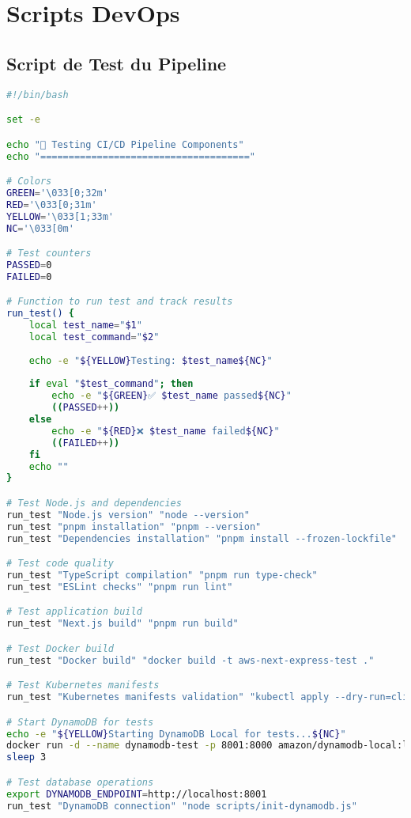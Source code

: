 \section{Scripts DevOps}

\subsection{Script de Test du Pipeline}

\begin{lstlisting}[language=bash, caption=scripts/test-pipeline.sh]
#!/bin/bash

set -e

echo "🧪 Testing CI/CD Pipeline Components"
echo "====================================="

# Colors
GREEN='\033[0;32m'
RED='\033[0;31m'
YELLOW='\033[1;33m'
NC='\033[0m'

# Test counters
PASSED=0
FAILED=0

# Function to run test and track results
run_test() {
    local test_name="$1"
    local test_command="$2"
    
    echo -e "${YELLOW}Testing: $test_name${NC}"
    
    if eval "$test_command"; then
        echo -e "${GREEN}✅ $test_name passed${NC}"
        ((PASSED++))
    else
        echo -e "${RED}❌ $test_name failed${NC}"
        ((FAILED++))
    fi
    echo ""
}

# Test Node.js and dependencies
run_test "Node.js version" "node --version"
run_test "pnpm installation" "pnpm --version"
run_test "Dependencies installation" "pnpm install --frozen-lockfile"

# Test code quality
run_test "TypeScript compilation" "pnpm run type-check"
run_test "ESLint checks" "pnpm run lint"

# Test application build
run_test "Next.js build" "pnpm run build"

# Test Docker build
run_test "Docker build" "docker build -t aws-next-express-test ."

# Test Kubernetes manifests
run_test "Kubernetes manifests validation" "kubectl apply --dry-run=client -f k8s/"

# Start DynamoDB for tests
echo -e "${YELLOW}Starting DynamoDB Local for tests...${NC}"
docker run -d --name dynamodb-test -p 8001:8000 amazon/dynamodb-local:latest > /dev/null 2>&1
sleep 3

# Test database operations
export DYNAMODB_ENDPOINT=http://localhost:8001
run_test "DynamoDB connection" "node scripts/init-dynamodb.js"


\end{lstlisting}
